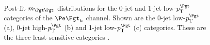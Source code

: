 \begin{figure}[tbh]


\caption[Post-fit $m_{\Pgt\Pgt}$ distributions for the 0-jet and 1-jet low-$\pt^{\Pgt}$ 
categories of the $\etau$ channel.]{Post-fit $m_{\Pgt\Pgt}$ distributions for
the 0-jet and 1-jet low-$\pt^{\Pgt}$ categories of the $\etau$ channel. Shown are the 0-jet
low-$\pt^{\Pgt}$ (a), 0-jet high-$\pt^{\Pgt}$ (b) and 1-jet
low-$\pt^{\Pgt}$ (c) categories. These are the three least sensitive categories \cite{HIG-13-004}.}
\label{fig:postfit0jet1jetetau}
\end{figure}

